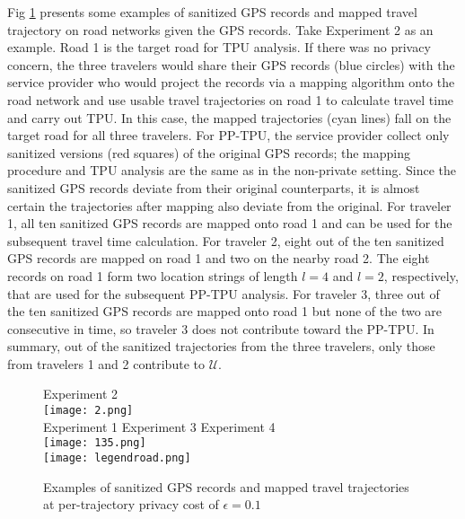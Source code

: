 \documentclass[10pt,journal,compsoc]{IEEEtran}
\begin{document}
Fig \ref{fig:road} presents some examples of  sanitized GPS records and mapped travel trajectory on road networks given the GPS records. Take Experiment 2 as an example. Road 1 is the target road for TPU analysis. If there was no privacy concern, the three travelers would share their GPS records (blue circles) with the service provider who would project the records via a mapping algorithm onto the road network and use usable travel trajectories on road 1 to calculate travel time and carry out TPU. In this case, the mapped trajectories (cyan lines) fall on the target road for all three travelers. For PP-TPU, the service provider collect only sanitized versions (red squares) of the original GPS records; the mapping procedure and TPU analysis are the same as in the non-private setting. Since the sanitized GPS records deviate from their original counterparts, it is almost certain the trajectories after mapping also deviate from the original. For traveler 1, all ten sanitized GPS records are mapped onto road 1 and can be used for the subsequent travel time calculation. For traveler 2, eight out of the ten  sanitized GPS records are mapped on road 1 and two on the nearby road 2.  The eight records on road 1 form two location strings of length $l=4$ and $l=2$, respectively, that are used for the subsequent PP-TPU analysis. For traveler 3, three out of the ten sanitized GPS records are mapped onto road 1 but none of the two are consecutive in time, so traveler 3 does not contribute toward the PP-TPU. In summary, out of the sanitized trajectories from the three travelers, only those from travelers 1 and 2 contribute to $\mathcal{U}$.
\begin{figure}[!htb]
\vspace{-6pt}\centering
 Experiment 2 \\
\texttt{[image: 2.png]}\\
\vspace{3pt} 
Experiment 1 \hspace{0.3in} Experiment 3 \hspace{0.3in} Experiment 4\\
\texttt{[image: 135.png]}\\
\texttt{[image: legendroad.png]}
\vspace{-6pt}
\caption{Examples of  sanitized GPS records and mapped travel trajectories at per-trajectory privacy cost of $\epsilon=0.1$}\label{fig:road}
\vspace{-6pt}
\end{figure}
\end{document}
